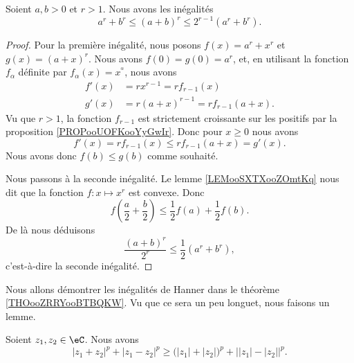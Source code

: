 \begin{lemma}       \label{LEMooFKKEooDTypUd}
	Soient \( a,b>0\) et \( r>1\). Nous avons les inégalités
	\begin{equation}
		a^r+b^r\leq (a+b)^r\leq 2^{r-1}(a^r+b^r).
	\end{equation}
\end{lemma}

\begin{proof}
	Pour la première inégalité, nous posons \( f(x)=a^r+x^r\) et \( g(x)=(a+x)^r\). Nous avons \( f(0)=g(0)=a^r\), et, en utilisant la fonction \( f_{\alpha}\) définite par \( f_{\alpha}(x)=x^{^\alpha}\), nous avons
	\begin{subequations}
		\begin{align}
			f'(x) & =rx^{r-1} =rf_{r-1}(x)       \\
			g'(x) & =r(a+x)^{r-1}=rf_{r-1}(a+x).
		\end{align}
	\end{subequations}
	Vu que \( r>1\), la fonction \( f_{r-1}\) est strictement croissante sur les positifs par la proposition \ref{PROPooUOFKooYyGwIr}. Donc pour \( x\geq 0\) nous avons
	\begin{equation}
		f'(x)=rf_{r-1}(x)\leq rf_{r-1}(a+x)=g'(x).
	\end{equation}
	Nous avons donc \( f(b)\leq g(b)\) comme souhaité.

	Nous passons à la seconde inégalité. Le lemme \ref{LEMooSXTXooZOmtKq} nous dit que la fonction \( f\colon x\mapsto x^r \) est convexe. Donc
	\begin{equation}
		f\left( \frac{ a }{2}+\frac{ b }{2} \right)\leq\frac{ 1 }{2}f(a)+\frac{ 1 }{2}f(b).
	\end{equation}
	De là nous déduisons
	\begin{equation}
		\frac{ (a+b)^r }{ 2^r }\leq \frac{ 1 }{2}(a^r+b^r),
	\end{equation}
	c'est-à-dire la seconde inégalité.
\end{proof}

Nous allons démontrer les inégalités de Hanner dans le théorème \ref{THOooZRRYooBTBQKW}. Vu que ce sera un peu longuet, nous faisons un lemme.
\begin{lemma}       \label{LEMooDHRCooQiSpyC}
	Soient \( z_1,z_2\in \eC\). Nous avons
	\begin{equation}        \label{EQooMUXVooSpGSyG}
		| z_1+z_2 |^p+| z_1-z_2 |^p\geq \big( | z_1 |+| z_2 | \big)^p+\big| | z_1 |-| z_2 | \big|^p.
	\end{equation}
\end{lemma}

